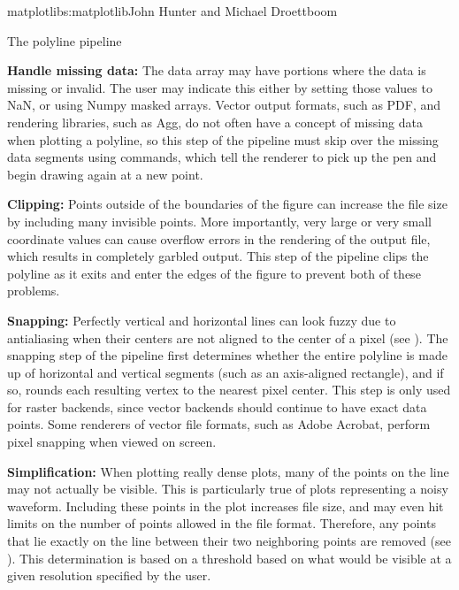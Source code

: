 \begin{aosachapter}{matplotlib}{s:matplotlib}{John Hunter and Michael Droettboom}
\begin{aosasect1}{The polyline pipeline}
\begin{aosaenumerate}
\item \textbf{Handle missing data:} The data array may have portions
  where the data is missing or invalid.  The user may indicate this
  either by setting those values to NaN, or using Numpy masked arrays.
  Vector output formats, such as PDF, and rendering libraries, such as
  Agg, do not often have a concept of missing data when plotting a
  polyline, so this step of the pipeline must skip over the missing
  data segments using  commands, which tell the renderer
  to pick up the pen and begin drawing again at a new point.

\item \textbf{Clipping:} Points outside of the boundaries of the
  figure can increase the file size by including many invisible
  points.  More importantly, very large or very small coordinate
  values can cause overflow errors in the rendering of the output
  file, which results in completely garbled output.  This step of the
  pipeline clips the polyline as it exits and enter the edges of the
  figure to prevent both of these problems.

\item \textbf{Snapping:} Perfectly vertical and horizontal lines can
  look fuzzy due to antialiasing when their centers are not aligned to
  the center of a pixel (see
  ).  The snapping step of
  the pipeline first determines whether the entire polyline is made up
  of horizontal and vertical segments (such as an axis-aligned
  rectangle), and if so, rounds each resulting vertex to the nearest
  pixel center.  This step is only used for raster backends, since
  vector backends should continue to have exact data points.  Some
  renderers of vector file formats, such as Adobe Acrobat, perform
  pixel snapping when viewed on screen.

\item \textbf{Simplification:} When plotting really dense plots, many
  of the points on the line may not actually be visible.  This is
  particularly true of plots representing a noisy waveform.  Including
  these points in the plot increases file size, and may even hit
  limits on the number of points allowed in the file format.
  Therefore, any points that lie exactly on the line between their two
  neighboring points are removed (see
  ).  This determination
  is based on a threshold based on what would be visible at a given
  resolution specified by the user.


\end{aosaenumerate}
\end{aosasect1}
\end{aosachapter}
